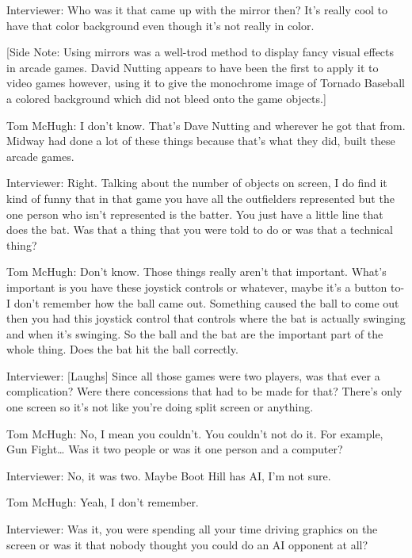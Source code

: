 \textcolor{interviewer}{Interviewer:} Who was it that came up with the mirror then? It’s really cool to have that color background even though it’s not really in color.

[Side Note: Using mirrors was a well-trod method to display fancy visual effects in arcade games. David Nutting appears to have been the first to apply it to video games however, using it to give the monochrome image of Tornado Baseball a colored background which did not bleed onto the game objects.]

\textcolor{interviewee}{Tom McHugh:} I don’t know. That’s Dave Nutting and wherever he got that from. Midway had done a lot of these things because that’s what they did, built these arcade games.

\textcolor{interviewer}{Interviewer:} Right. Talking about the number of objects on screen, I do find it kind of funny that in that game you have all the outfielders represented but the one person who isn’t represented is the batter. You just have a little line that does the bat. Was that a thing that you were told to do or was that a technical thing?

\textcolor{interviewee}{Tom McHugh:} Don’t know. Those things really aren’t that important. What’s important is you have these joystick controls or whatever, maybe it’s a button to- I don’t remember how the ball came out. Something caused the ball to come out then you had this joystick control that controls where the bat is actually swinging and when it’s swinging. So the ball and the bat are the important part of the whole thing. Does the bat hit the ball correctly.

\textcolor{interviewer}{Interviewer:} [Laughs] Since all those games were two players, was that ever a complication? Were there concessions that had to be made for that? There’s only one screen so it’s not like you’re doing split screen or anything.

\textcolor{interviewee}{Tom McHugh:} No, I mean you couldn’t. You couldn’t not do it. For example, Gun Fight… Was it two people or was it one person and a computer?

\textcolor{interviewer}{Interviewer:} No, it was two. Maybe Boot Hill has AI, I’m not sure.

\textcolor{interviewee}{Tom McHugh:} Yeah, I don’t remember.

\textcolor{interviewer}{Interviewer:} Was it, you were spending all your time driving graphics on the screen or was it that nobody thought you could do an AI opponent at all?

